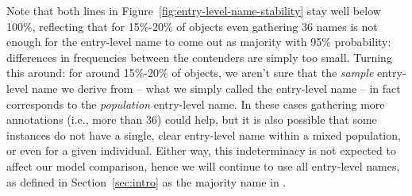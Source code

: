 Note that both lines in Figure~\ref{fig:entry-level-name-stability} stay well below 100\%, reflecting that for 15\%-20\% of objects even gathering 36 names is not enough for the entry-level name to come out as majority with 95\% probability: differences in frequencies between the contenders are simply too small.
Turning this around: for around 15\%-20\% of objects, we aren't sure that the \emph{sample} entry-level name we derive from \mn -- what we simply called the entry-level name -- in fact corresponds to the \emph{population} entry-level name.
In these cases gathering more annotations (i.e., more than 36) could help, but it is also possible that some instances do not have a single, clear entry-level name within a mixed population, or even for a given individual.
Either way, this indeterminacy is not expected to affect our model comparison, hence we will continue to use all entry-level names, as defined in Section~\ref{sec:intro} as the majority name in \mn.




